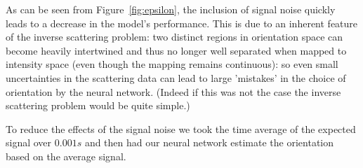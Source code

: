 \documentclass[12pt]{spieman}
\begin{document}
\begin{spacing}{1.5}
As can be seen from Figure~\ref{fig:epsilon}, the inclusion of signal noise quickly leads to a decrease in the model's performance. This is due to an inherent feature of the inverse scattering problem: two distinct regions in orientation space can become heavily intertwined and thus no longer well separated when mapped to intensity space (even though the mapping remains continuous): so even small uncertainties in the scattering data can lead to large 'mistakes' in the choice of orientation by the neural network. (Indeed if this was not the case the inverse scattering problem would be quite simple.) 

To reduce the effects of the signal noise we took the time average of the expected signal over $0.001 s$ and then had our neural network estimate the orientation based on the average signal.


\end{spacing}
\end{document}
